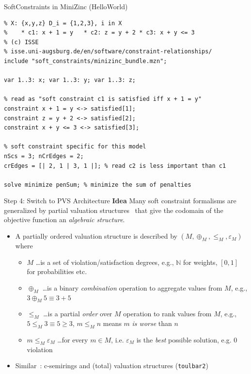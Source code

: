\documentclass[10pt,xcolor={dvipsnames},fleqn]{beamer}
\begin{document}
\begin{frame}[fragile]{SoftConstraints in MiniZinc (HelloWorld)}
\begin{lstlisting}
% X: {x,y,z} D_i = {1,2,3}, i in X
%    * c1: x + 1 = y   * c2: z = y + 2 * c3: x + y <= 3
% (c) ISSE
% isse.uni-augsburg.de/en/software/constraint-relationships/
include "soft_constraints/minizinc_bundle.mzn";

var 1..3: x; var 1..3: y; var 1..3: z;

% read as "soft constraint c1 is satisfied iff x + 1 = y"
constraint x + 1 = y <-> satisfied[1];
constraint z = y + 2 <-> satisfied[2];
constraint x + y <= 3 <-> satisfied[3];

% soft constraint specific for this model
nScs = 3; nCrEdges = 2;
crEdges = [| 2, 1 | 3, 1 |]; % read c2 is less important than c1

solve minimize penSum; % minimize the sum of penalties
\end{lstlisting}
\end{frame}

\begin{frame}[fragile]{Step 4: Switch to PVS Architecture}
\textbf{Idea} Many soft constraint formalisms are generalized by \alert{partial valuation structures}~\cite{Gadducci2013} that
give the codomain of the objective function an \emph{algebraic structure}.
\begin{itemize}
\item A partially ordered valuation structure is described by $(M, \oplus_M, \leq_M, \varepsilon_M)$ where 
\begin{itemize}
\item $M$ \ldots is a set of violation/satisfaction degrees, e.g., $\mathbb{N}$ for weights, $[0,1]$ for probabilities etc.
\item $\oplus_M$ \ldots is a binary \emph{combination} operation to aggregate values from $M$, e.g., $3 \oplus_M  5 \equiv 3 + 5$
\item $\leq_M$ \ldots is a partial \emph{order} over $M$ operation to rank values from $M$, e.g., $5 \leq_M  3 \equiv 5 \geq 3$, $m \leq_M n$ means $m$ \emph{is worse} than $n$
\item $m \leq_M \varepsilon_M$ \ldots for every $m \in M$, i.e. $\varepsilon_M$ is the \emph{best} possible solution, e.g. $0$ violation 
\end{itemize}
\item Similar~\cite{Bistarelli1999}: c-semirings and (total) valuation structures (\texttt{toulbar2})
\end{itemize}
\end{frame}
\end{document}
